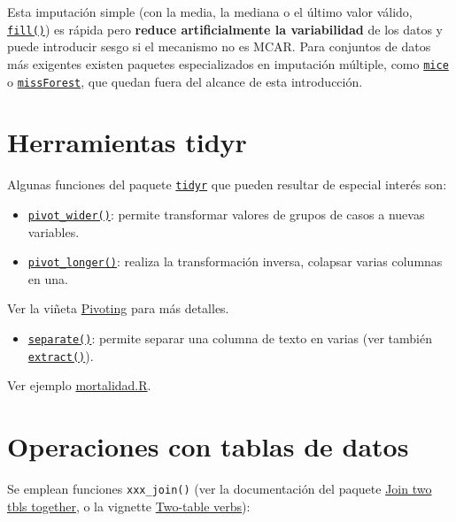 \documentclass[
]{book}
\providecommand{\tightlist}{%
  \setlength{\itemsep}{0pt}\setlength{\parskip}{0pt}}
\theoremstyle{break}
\theoremstyle{nonumberplain}
\begin{document}
Esta imputación simple (con la media, la mediana o el último valor válido, \href{https://tidyr.tidyverse.org/reference/fill.html}{\texttt{fill()}}) es rápida pero \textbf{reduce artificialmente la variabilidad} de los datos y puede introducir sesgo si el mecanismo no es MCAR. Para conjuntos de datos más exigentes existen paquetes especializados en imputación múltiple, como \href{https://cran.r-project.org/package=mice}{\texttt{mice}} o \href{https://cran.r-project.org/package=missForest}{\texttt{missForest}}, que quedan fuera del alcance de esta introducción.

\section{Herramientas tidyr}\label{tidyr-pkg}

Algunas funciones del paquete \href{https://tidyr.tidyverse.org}{\texttt{tidyr}} que pueden resultar de especial interés son:

\begin{itemize}
\tightlist
\item
  \href{https://tidyr.tidyverse.org/reference/pivot_wider.html}{\texttt{pivot\_wider()}}: permite transformar valores de grupos de casos a nuevas variables.
\item
  \href{https://tidyr.tidyverse.org/reference/pivot_longer.html}{\texttt{pivot\_longer()}}: realiza la transformación inversa, colapsar varias columnas en una.
\end{itemize}

Ver la viñeta \href{https://tidyr.tidyverse.org/articles/pivot.html}{Pivoting} para más detalles.

\begin{itemize}
\tightlist
\item
  \href{https://tidyr.tidyverse.org/reference/separate.html}{\texttt{separate()}}: permite separar una columna de texto en varias (ver también \href{https://tidyr.tidyverse.org/reference/extract.html}{\texttt{extract()}}).
\end{itemize}

Ver ejemplo \href{data/mortalidad.R}{mortalidad.R}.

\section{Operaciones con tablas de datos}\label{dplyr-join}

Se emplean funciones \texttt{xxx\_join()} (ver la documentación del paquete
\href{https://dplyr.tidyverse.org/reference/join.html}{Join two tbls together},
o la vignette \href{https://dplyr.tidyverse.org/articles/two-table.html}{Two-table verbs}):
\end{document}
